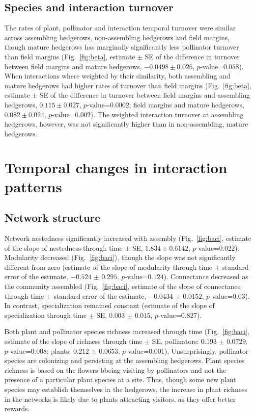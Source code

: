 \documentclass[12pt]{article}
\begin{document}
\subsection*{Species and interaction turnover}
The rates of plant, pollinator and interaction temporal turnover were
similar across assembling hedgerows, non-assembling hedgerows and
field margins, though mature hedgerows has marginally significantly
less pollinator turnover than field margins (Fig.~\ref{fig:beta},
estimate $\pm$ SE of the difference in
turnover between field margins and mature hedgerows, $-0.0498 \pm
0.026$, $p$-value=$0.058$). When interactions where weighted by their
similarity, both assembling and mature hedgerows had higher rates of
turnover than field margins (Fig.~\ref{fig:beta}, estimate $\pm$
SE of the difference in turnover between
field margins and assembling hedgerows, $0.115 \pm 0.027$,
$p$-value=$0.0002$; field margins and mature hedgerows, $0.082 \pm
0.024$, $p$-value=$0.002$). The weighted interaction turnover at
assembling hedgerows, however, was not significantly higher than in
non-assembling, mature hedgerows.

\section*{Temporal changes in interaction patterns}
\subsection*{Network structure}
Network nestedness significantly increased with assembly
(Fig.~\ref{fig:baci}, estimate of the slope of nestedness through time
$\pm$ SE, $1.834 \pm 0.6142$,
$p$-value=$0.022$). Modularity decreased (Fig.~\ref{fig:baci}),
though the slope was not significantly different from zero (estimate
of the slope of modularity through time $\pm$ standard error of the
estimate, $-0.524$ $\pm$ $0.295$, $p$-value=$0.124$). Connectance
decreased as the community assembled (Fig.~\ref{fig:baci}, estimate of
the slope of connectance through time $\pm$ standard error of the
estimate, $-0.0434$ $\pm$ $0.0152$, $p$-value=$0.03$). In contrast,
specialization remained constant (estimate of the slope of
specialization through time $\pm$ SE,
$0.003$ $\pm$ $0.015$, $p$-value=$0.827$).

Both plant and pollinator species richness increased through time
(Fig.~\ref{fig:baci}, estimate of the slope of richness through time
$\pm$ SE, pollinators: $0.193$ $\pm$
$0.0729$, $p$-value=$0.008$; plants: $0.212$ $\pm$ $0.0653$,
$p$-value=$0.001$). Unsurprisingly, pollinator species are colonizing
and persisting at the assembling hedgerows. Plant species richness is
based on the flowers bbeing visiting by pollinators and not the
presence of a particular plant species at a site. Thus, though some
new plant species may establish themselves in the hedgerows, the
increase in plant richness in the networks is likely due to plants
attracting visitors, as they offer better rewards.
\end{document}
